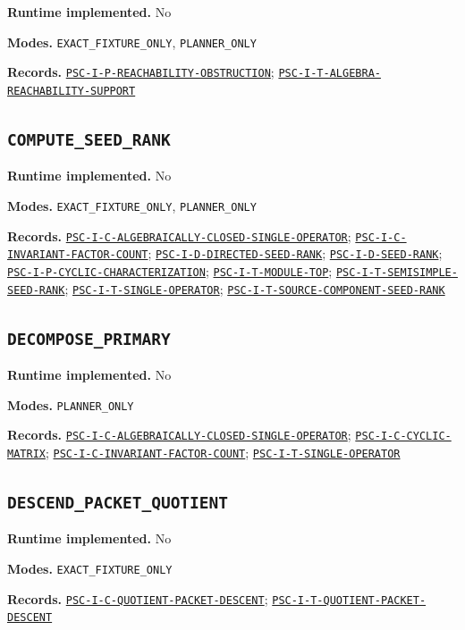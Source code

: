\documentclass[a4paper,11pt]{article}
\newcommand{\field}[2]{\noindent\textbf{#1.} #2\par}
\begin{document}
\field{Runtime implemented}{No}
\field{Modes}{\nolinkurl{EXACT_FIXTURE_ONLY}, \nolinkurl{PLANNER_ONLY}}
\field{Records}{\hyperref[rec:PSC-I-P-REACHABILITY-OBSTRUCTION]{\nolinkurl{PSC-I-P-REACHABILITY-OBSTRUCTION}}; \hyperref[rec:PSC-I-T-ALGEBRA-REACHABILITY-SUPPORT]{\nolinkurl{PSC-I-T-ALGEBRA-REACHABILITY-SUPPORT}}}
\subsection*{\nolinkurl{COMPUTE_SEED_RANK}}
\field{Runtime implemented}{No}
\field{Modes}{\nolinkurl{EXACT_FIXTURE_ONLY}, \nolinkurl{PLANNER_ONLY}}
\field{Records}{\hyperref[rec:PSC-I-C-ALGEBRAICALLY-CLOSED-SINGLE-OPERATOR]{\nolinkurl{PSC-I-C-ALGEBRAICALLY-CLOSED-SINGLE-OPERATOR}}; \hyperref[rec:PSC-I-C-INVARIANT-FACTOR-COUNT]{\nolinkurl{PSC-I-C-INVARIANT-FACTOR-COUNT}}; \hyperref[rec:PSC-I-D-DIRECTED-SEED-RANK]{\nolinkurl{PSC-I-D-DIRECTED-SEED-RANK}}; \hyperref[rec:PSC-I-D-SEED-RANK]{\nolinkurl{PSC-I-D-SEED-RANK}}; \hyperref[rec:PSC-I-P-CYCLIC-CHARACTERIZATION]{\nolinkurl{PSC-I-P-CYCLIC-CHARACTERIZATION}}; \hyperref[rec:PSC-I-T-MODULE-TOP]{\nolinkurl{PSC-I-T-MODULE-TOP}}; \hyperref[rec:PSC-I-T-SEMISIMPLE-SEED-RANK]{\nolinkurl{PSC-I-T-SEMISIMPLE-SEED-RANK}}; \hyperref[rec:PSC-I-T-SINGLE-OPERATOR]{\nolinkurl{PSC-I-T-SINGLE-OPERATOR}}; \hyperref[rec:PSC-I-T-SOURCE-COMPONENT-SEED-RANK]{\nolinkurl{PSC-I-T-SOURCE-COMPONENT-SEED-RANK}}}
\subsection*{\nolinkurl{DECOMPOSE_PRIMARY}}
\field{Runtime implemented}{No}
\field{Modes}{\nolinkurl{PLANNER_ONLY}}
\field{Records}{\hyperref[rec:PSC-I-C-ALGEBRAICALLY-CLOSED-SINGLE-OPERATOR]{\nolinkurl{PSC-I-C-ALGEBRAICALLY-CLOSED-SINGLE-OPERATOR}}; \hyperref[rec:PSC-I-C-CYCLIC-MATRIX]{\nolinkurl{PSC-I-C-CYCLIC-MATRIX}}; \hyperref[rec:PSC-I-C-INVARIANT-FACTOR-COUNT]{\nolinkurl{PSC-I-C-INVARIANT-FACTOR-COUNT}}; \hyperref[rec:PSC-I-T-SINGLE-OPERATOR]{\nolinkurl{PSC-I-T-SINGLE-OPERATOR}}}
\subsection*{\nolinkurl{DESCEND_PACKET_QUOTIENT}}
\field{Runtime implemented}{No}
\field{Modes}{\nolinkurl{EXACT_FIXTURE_ONLY}}
\field{Records}{\hyperref[rec:PSC-I-C-QUOTIENT-PACKET-DESCENT]{\nolinkurl{PSC-I-C-QUOTIENT-PACKET-DESCENT}}; \hyperref[rec:PSC-I-T-QUOTIENT-PACKET-DESCENT]{\nolinkurl{PSC-I-T-QUOTIENT-PACKET-DESCENT}}}
\end{document}
